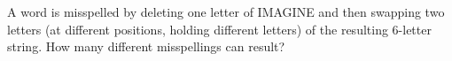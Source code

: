 A word is misspelled by deleting one letter of IMAGINE and then swapping two letters (at different positions, holding different letters) of the resulting $6$-letter string. How many different misspellings can result?

